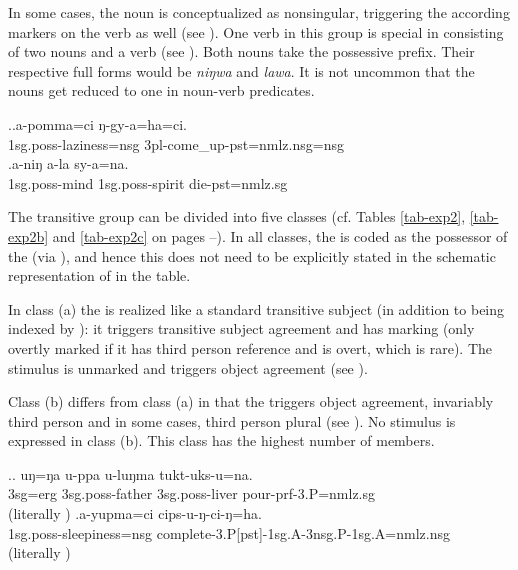 In some cases, the noun is conceptualized as nonsingular, triggering  the according   markers on the verb as well (see \Next[a]). One verb in this group is special in consisting of  two nouns and a verb  (see \Next[b]). Both nouns take the possessive prefix. Their respective full forms would be \emph{niŋwa} and \emph{lawa}. It is not uncommon that the nouns get reduced to one  in noun-verb predicates.

\ex.\ag.a-pomma=ci ŋ-gy-a=ha=ci.\\
{\sc 1sg.poss-}laziness{\sc =nsg} {\sc 3pl-}come\_up{\sc -pst=nmlz.nsg=nsg}\\
\bg.a-niŋ a-la sy-a=na.\\
{\sc 1sg.poss-}mind {\sc 1sg.poss-}spirit die{\sc [3sg]-pst=nmlz.sg}\\



The transitive group can be divided into five classes (cf. Tables \ref{tab-exp2}, \ref{tab-exp2b} and \ref{tab-exp2c} on pages \pageref{tab-exp2}--\pageref{tab-exp2c}). In all classes, the  is coded as the possessor of the  (via ), and hence this does not need to be explicitly stated in the schematic representation of  in the table. 

In class (a) the  is realized like a standard transitive subject (in addition to being indexed by ): it  triggers transitive subject agreement and has   marking (only overtly marked if it has third person reference and is overt, which is rare). The stimulus is unmarked and triggers object agreement (see \Next[a]). 

Class (b) differs from class (a) in that the  triggers object agreement, invariably third person and in some cases, third person plural (see \Next[b]). No stimulus is expressed in class (b). This class has the highest number of members. 

 \ex.\ag. uŋ=ŋa   u-ppa             u-luŋma  tukt-uks-u=na.\\
{\sc 3sg=erg} {\sc 3sg.poss-}father {\sc 3sg.poss-}liver pour{\sc -prf-3.P=nmlz.sg}\\
 (literally )
\bg.\label{ex-yupmaci}a-yupma=ci cips-u-ŋ-ci-ŋ=ha.\\
 {\sc 1sg.poss-}sleepiness{\sc =nsg} complete{\sc -3.P[pst]-1sg.A-3nsg.P-1sg.A=nmlz.nsg}\\
 (literally )

